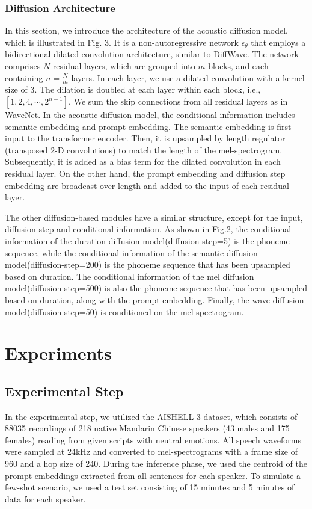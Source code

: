 \documentclass{article}
\begin{document}
\subsubsection{Diffusion  Architecture}
In this section, we introduce the architecture of the acoustic diffusion model, which is illustrated in Fig. 3.  It is a non-autoregressive network $\epsilon_{\theta}$ that employs a bidirectional dilated convolution architecture, similar to DiffWave\cite{kong2020diffwave}. The network comprises $N$ residual layers, which are grouped into $m$ blocks, and each containing $n = \frac{N}{m}$ layers. In each layer, we use a dilated convolution with a kernel size of $3$. The dilation is doubled at each layer within each block, i.e., $[1, 2, 4, \cdots, 2^{n-1}]$. We sum the skip connections from all residual layers as in WaveNet\cite{oord2016wavenet}. In the acoustic diffusion model, the conditional information includes semantic embedding and prompt embedding. The semantic embedding is first input to the transformer encoder. Then, it is upsampled by length regulator (transposed 2-D convolutions) to match the length of the mel-spectrogram. Subsequently, it is added as a bias term for the dilated convolution in each residual layer. On the other hand, the prompt embedding and diffusion step embedding are broadcast over length and added to the input of each residual layer.

The other diffusion-based modules have a similar structure, except for the input, diffusion-step and conditional information. As shown in Fig.2, the conditional information of the duration diffusion model(diffusion-step=5) is the phoneme sequence, while the conditional information of the semantic diffusion model(diffusion-step=200) is the phoneme sequence that has been upsampled based on duration. The conditional information of the mel diffusion model(diffusion-step=500) is also the phoneme sequence that has been upsampled based on duration, along with the prompt embedding. Finally, the wave diffusion model(diffusion-step=50) is conditioned on the mel-spectrogram.


\section{Experiments}

\subsection{Experimental Step}
In the experimental step, we utilized the AISHELL-3 dataset\cite{shi2020aishell}, which consists of 88035 recordings of 218 native Mandarin Chinese speakers (43 males and 175 females) reading from given scripts with neutral emotions. All speech waveforms were sampled at 24kHz and converted to mel-spectrograms with a frame size of 960 and a hop size of 240. During the inference phase, we used the centroid of the prompt embeddings extracted from all sentences for each speaker. To simulate a few-shot scenario, we used a test set consisting of 15 minutes and 5 minutes of data for each speaker.
\end{document}
